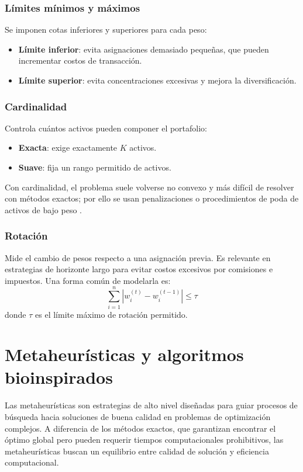 \documentclass[12pt]{article}
\begin{document}
\subsubsection{Límites mínimos y máximos}
Se imponen cotas inferiores
y superiores para cada peso:
\begin{itemize}
  \item \textbf{Límite inferior}: evita asignaciones demasiado
    pequeñas, que pueden incrementar costos de transacción.
  \item \textbf{Límite superior}: evita concentraciones excesivas y
    mejora la diversificación.
\end{itemize}

\subsubsection{Cardinalidad}
Controla cuántos activos pueden componer
el portafolio:
\begin{itemize}
  \item \textbf{Exacta}: exige exactamente $K$ activos.
  \item \textbf{Suave}: fija un rango permitido de activos.
\end{itemize} Con cardinalidad, el problema suele volverse no convexo
y más difícil de resolver con métodos exactos; por ello se usan
penalizaciones o procedimientos de poda de activos de bajo peso
.
\subsubsection{Rotación}
Mide el cambio de pesos respecto a una
asignación previa. Es relevante en estrategias de horizonte largo
para evitar costos excesivos por comisiones e impuestos. Una forma
común de modelarla es:
\begin{equation}
  \sum_{i=1}^{n} |w_i^{(t)} - w_i^{(t-1)}| \le \tau
\end{equation}
donde $\tau$ es el límite máximo de rotación permitido.

\section{Metaheurísticas y algoritmos bioinspirados}

Las metaheurísticas son estrategias de alto nivel diseñadas para
guiar procesos de búsqueda hacia soluciones de buena calidad en
problemas de optimización complejos. A diferencia de los métodos
exactos, que garantizan encontrar el óptimo global pero pueden
requerir tiempos computacionales prohibitivos, las metaheurísticas
buscan un equilibrio entre calidad de solución y eficiencia
computacional.
\end{document}
